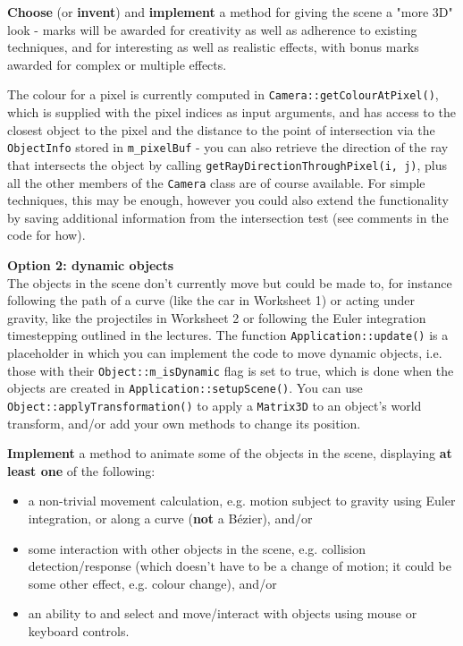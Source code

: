 \documentclass{../../../fal_assignment}
\begin{document}
\textbf{Choose} (or \textbf{invent}) and \textbf{implement} a method for giving the scene a "more 3D" look - marks will be awarded for creativity as well as adherence to existing techniques, and for interesting as well as realistic effects, with bonus marks awarded for complex or multiple effects.

The colour for a pixel is currently computed in \lstinline{Camera::getColourAtPixel()}, which is supplied with the pixel indices as input arguments, and has access to the closest object to the pixel and the distance to the point of intersection via the \lstinline{ObjectInfo} stored in \lstinline{m_pixelBuf} - you can also retrieve the direction of the ray that intersects the object by calling \lstinline{getRayDirectionThroughPixel(i, j)}, plus all the other members of the \lstinline{Camera} class are of course available. For simple techniques, this may be enough, however you could also extend the functionality by saving additional information from the intersection test (see comments in the code for how).

\textbf{Option 2: dynamic objects}\\
The objects in the scene don't currently move but could be made to, for instance following the path of a curve (like the car in Worksheet 1) or acting under gravity, like the projectiles in Worksheet 2 or following the Euler integration timestepping outlined in the lectures. The function \lstinline{Application::update()} is a placeholder in which you can implement the code to move dynamic objects, i.e. those with their \lstinline{Object::m_isDynamic} flag is set to true, which is done when the objects are created in \lstinline{Application::setupScene()}. You can use \lstinline{Object::applyTransformation()} to apply a \lstinline{Matrix3D} to an object's world transform, and/or add your own methods to change its position.

\textbf{Implement} a method to animate some of the objects in the scene, displaying \textbf{at least one} of the following:
\begin{itemize}
	\item a non-trivial movement calculation, e.g. motion subject to gravity using Euler integration, or along a curve (\textbf{not} a B\'ezier), and/or
	\item some interaction with other objects in the scene, e.g. collision detection/response (which doesn't have to be a change of motion; it could be some other effect, e.g. colour change), and/or
	\item an ability to and select and move/interact with objects using mouse or keyboard controls.
\end{itemize}
\end{document}
